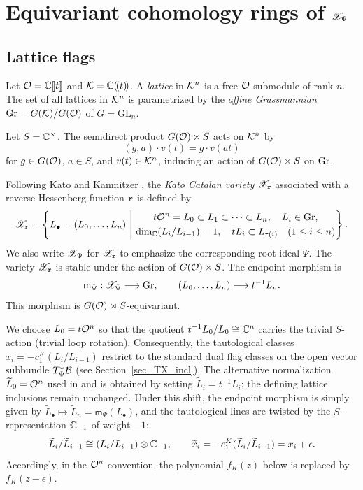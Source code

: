 \section{Equivariant cohomology rings of \texorpdfstring{$\mathscr X_\Psi$}{X\_Psi}}\label{sec_xpsi}

\subsection{Lattice flags}\label{ss:def_xpsi}

Let $\mathcal O=\mathbb C\llbracket t\rrbracket$ and $\mathcal K=\mathbb C(\!(t)\!)$.
A \emph{lattice} in $\mathcal K^n$ is a free $\mathcal O$-submodule of rank $n$.
The set of all lattices in $\mathcal K^n$ is parametrized by the \emph{affine Grassmannian}
$\mathrm{Gr}=G(\mathcal K)/G(\mathcal O)$ of $G=\mathrm{GL}_n$.

Let $S=\mathbb C^\times$. The semidirect product $G(\mathcal O)\rtimes S$ acts on $\mathcal K^n$ by
\[
  (g,a)\cdot v(t) = g \cdot v(at)
\]
for $g\in G(\mathcal O)$, $a\in S$, and $v(t)\in \mathcal K^n$, inducing an action of $G(\mathcal O)\rtimes S$ on $\mathrm{Gr}$.

Following Kato \cite{kato2023geometric} and Kamnitzer \cite{kamnitzer2024fixed},
the \emph{Kato Catalan variety} $\mathscr X_{\mathtt r}$ associated with a reverse
Hessenberg function $\mathtt r$ is defined by
\[
 \SX_{\rfunc}=\left\{L_\bullet=(L_0,\dots,L_n)\ \middle|\
 \begin{gathered}
 t\CO^n=L_0\subset L_1\subset\cdots\subset L_n,\quad L_i\in\Gr,\\
 \dim_\C(L_i/L_{i-1})=1,\quad tL_i\subset L_{\rfunc(i)}
 \quad(1\leq i\leq n)
 \end{gathered}\right\}.
\]
We also write $\mathscr X_\Psi$ for $\mathscr X_{\mathtt r}$ to emphasize the corresponding root ideal $\Psi$.
The variety $\mathscr X_{\mathtt r}$ is stable under the action of $G(\mathcal O)\rtimes S$.
The endpoint morphism is
\[
  \mathsf m_\Psi:\mathscr X_\Psi\longrightarrow\mathrm{Gr},\qquad
  (L_0,\dots,L_n)\longmapsto t^{-1}L_n.
\]
This morphism is $G(\mathcal O)\rtimes S$-equivariant.

\begin{remark}\label{rem:lattice_normalization}
We choose $L_0=t\mathcal O^n$ so that the quotient
$t^{-1}L_0/L_0\cong\mathbb C^n$ carries the trivial $S$-action (trivial loop rotation).
Consequently, the tautological classes $x_i=-c_1^K(L_i/L_{i-1})$ restrict to the standard
dual flag classes on the open vector subbundle $T^*_\Psi\mathcal B$ (see Section~\ref{sec_TX_incl}).
The alternative normalization $\widetilde L_0=\mathcal O^n$ used in
\cite[\S2.1]{kamnitzer2024fixed} and \cite[Lemma~6.1]{cautis2018quantum}
is obtained by setting $\widetilde L_i=t^{-1}L_i$; the defining lattice inclusions
remain unchanged. Under this shift, the endpoint morphism is simply given by
$\widetilde L_\bullet\mapsto\widetilde L_n=\mathsf m_\Psi(L_\bullet)$, and the tautological lines are twisted
by the $S$-representation $\mathbb C_{-1}$ of weight $-1$:
\[
 \widetilde L_i/\widetilde L_{i-1}
 \cong(L_i/L_{i-1})\otimes\mathbb C_{-1},\qquad
 \widetilde x_i=-c_1^K(\widetilde L_i/\widetilde L_{i-1})
   =x_i+\epsilon.
\]
Accordingly, in the $\mathcal O^n$ convention, the polynomial $f_K(z)$ below is replaced by $f_K(z-\epsilon)$.
\end{remark}

